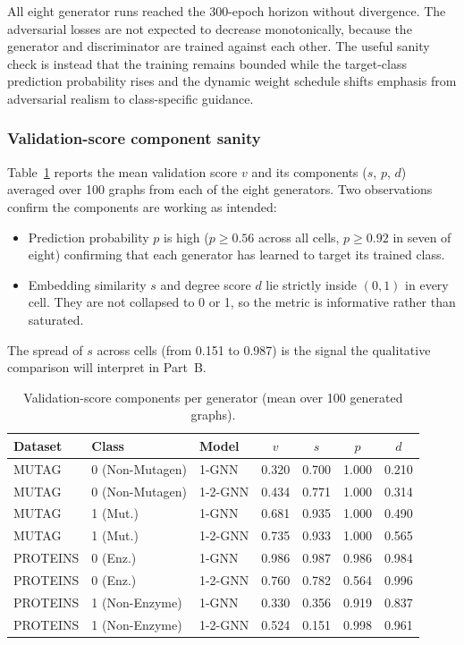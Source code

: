 \documentclass[12pt,a4paper]{article}
\begin{document}
All eight generator runs reached the 300-epoch horizon without divergence. The adversarial losses are not expected to decrease monotonically, because the generator and discriminator are trained against each other. The useful sanity check is instead that the training remains bounded while the target-class prediction probability rises and the dynamic weight schedule shifts emphasis from adversarial realism to class-specific guidance.

\subsubsection{Validation-score component sanity}

Table~\ref{tab:sanity} reports the mean validation score $v$ and its components ($s$, $p$, $d$) averaged over 100 graphs from each of the eight generators. Two observations confirm the components are working as intended:
\begin{itemize}[nosep]
  \item Prediction probability $p$ is high ($p \geq 0.56$ across all cells, $p \geq 0.92$ in seven of eight) confirming that each generator has learned to target its trained class.
  \item Embedding similarity $s$ and degree score $d$ lie strictly inside $(0,1)$ in every cell. They are not collapsed to 0 or 1, so the metric is informative rather than saturated.
\end{itemize}
The spread of $s$ across cells (from 0.151 to 0.987) is the signal the qualitative comparison will interpret in Part~B.

\begin{table}[htbp]
\centering
\caption{Validation-score components per generator (mean over 100 generated graphs).}
\label{tab:sanity}
\begin{tabular}{lllcccc}
\toprule
\textbf{Dataset} & \textbf{Class} & \textbf{Model} & $v$ & $s$ & $p$ & $d$ \\
\midrule
MUTAG    & 0 (Non-Mutagen)    & 1-GNN   & 0.320 & 0.700 & 1.000 & 0.210 \\
MUTAG    & 0 (Non-Mutagen)    & 1-2-GNN & 0.434 & 0.771 & 1.000 & 0.314 \\
MUTAG    & 1 (Mut.)   & 1-GNN   & 0.681 & 0.935 & 1.000 & 0.490 \\
MUTAG    & 1 (Mut.)   & 1-2-GNN & 0.735 & 0.933 & 1.000 & 0.565 \\
\midrule
PROTEINS & 0 (Enz.)   & 1-GNN   & 0.986 & 0.987 & 0.986 & 0.984 \\
PROTEINS & 0 (Enz.)   & 1-2-GNN & 0.760 & 0.782 & 0.564 & 0.996 \\
PROTEINS & 1 (Non-Enzyme)     & 1-GNN   & 0.330 & 0.356 & 0.919 & 0.837 \\
PROTEINS & 1 (Non-Enzyme)     & 1-2-GNN & 0.524 & 0.151 & 0.998 & 0.961 \\
\bottomrule
\end{tabular}
\end{table}
\end{document}
